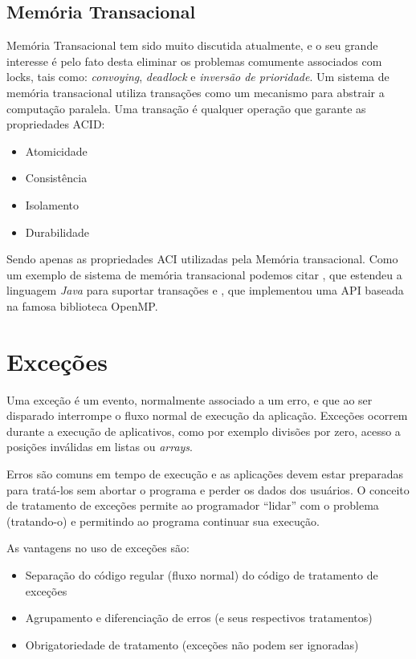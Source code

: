 \subsection{Memória Transacional}


Memória Transacional tem sido muito discutida atualmente, e o seu grande
interesse é pelo fato desta eliminar os problemas comumente associados com
locks, tais como: \cite{xxx} {\it convoying}, \cite{xxx} {\it deadlock} e
\cite{xxx} {\it inversão de
prioridade}. Um sistema de memória transacional utiliza \cite{xxx} transações como
um mecanismo para abstrair a computação paralela. Uma transação é qualquer
operação que garante as propriedades ACID:

\begin{itemize}
    \item Atomicidade
    \item Consistência
    \item Isolamento
    \item Durabilidade
\end{itemize}

Sendo apenas as propriedades ACI utilizadas pela Memória transacional. Como
um exemplo de sistema de memória transacional podemos citar  \cite{xxx},
que estendeu a linguagem \textit{Java} para suportar transações e
\cite{xxx}, que implementou uma API baseada na famosa biblioteca OpenMP.

\section{Exceções}
\label{sec:except}

Uma exceção é um evento, normalmente associado a um erro, e que ao ser disparado interrompe o 
fluxo normal de execução da aplicação. Exceções ocorrem durante a execução de aplicativos, como 
por exemplo divisões por zero, acesso a posições inválidas em listas ou
\textit{arrays}.

Erros são comuns em tempo de execução e as aplicações devem estar
preparadas para tratá-los sem abortar o programa e perder os dados dos
usuários. O conceito de tratamento de exceções permite ao programador
``lidar'' com o problema (tratando-o) e permitindo ao programa continuar
sua execução.

As vantagens no uso de exceções são: 

\begin{itemize}
\item Separação do código regular (fluxo normal) do código de tratamento de exceções
\item Agrupamento e diferenciação de erros (e seus respectivos tratamentos)
\item Obrigatoriedade de tratamento (exceções não podem ser ignoradas)
\end{itemize}


